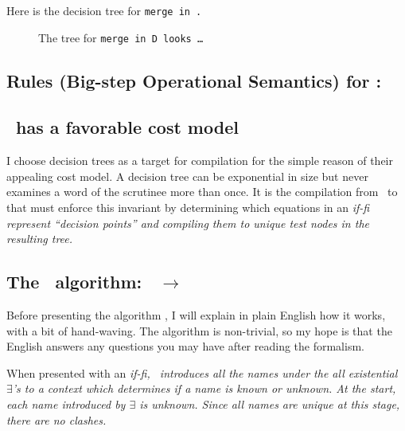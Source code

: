 \documentclass[manuscript,screen,review, 12pt, nonacm]{acmart}
\begin{document}
    Here is the decision tree for \tt{merge} in \D. 

    \begin{figure}[H]
        \caption{The tree for \tt{merge} in D looks \dots {}}
    \end{figure}


    \subsection{Rules (Big-step Operational Semantics) for \D:}
    

    \subsection{\D\ has a favorable cost model}
    I choose decision trees as a target for compilation for the simple reason of
    their appealing cost model. A decision tree can be exponential in size but
    never examines a word of the scrutinee more than once. It is the compilation
    from \VMinus\ to \D that must enforce this invariant by determining which
    equations in an \it{if-fi} represent “decision points” and compiling them to
    unique \it{test} nodes in the resulting tree. 
    
    \subsection{The \DTran\ algorithm: \VMinus\ $\rightarrow$ \D}

    Before presenting the algorithm \DTran, I will explain in plain English how
    it works, with a bit of hand-waving. The algorithm is non-trivial, so my
    hope is that the English answers any questions you may have after reading 
    the formalism. 

    When presented with an \it{if-fi}, \DTran\ introduces all the names under
    the all existential $\exists$'s to a context which determines if a name is
    \it{known} or \it{unknown}. At the start, each name introduced by $\exists$
    is \it{unknown}. Since all names are unique at this stage, there are no
    clashes. 


\end{document}
